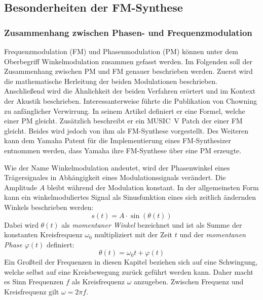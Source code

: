 \subsection{Besonderheiten der FM-Synthese}
\FloatBarrier
\subsubsection{Zusammenhang zwischen Phasen- und Frequenzmodulation}
Frequenzmodulation (FM) und Phasenmodulation (PM) können unter dem Oberbegriff Winkelmodulation zusammen gefasst werden. Im Folgenden soll der Zusammenhang zwischen PM und FM genauer beschrieben werden. Zuerst wird die mathematische Herleitung der beiden Modulationen beschrieben. Anschließend wird die Ähnlichkeit der beiden Verfahren erörtert und im Kontext der Akustik beschrieben.
Interessanterweise führte die Publikation von Chowning zu anfänglicher Verwirrung. In seinem Artikel definiert er eine Formel, welche einer PM gleicht. Zusätzlich beschreibt er ein MUSIC~V Patch der einer FM gleicht. Beides wird jedoch von ihm als FM-Synthese vorgestellt. \cite{rossum1999method} Des Weiteren kann dem Yamaha Patent für die Implementierung eines FM-Synthesizer entnommen werden, dass Yamaha ihre FM-Synthese über eine PM erzeugte. \cite{oya1987electronic} 

Wie der Name Winkelmodulation andeutet, wird der Phasenwinkel eines Trägersignales in Abhängigkeit eines Modulationssignals verändert. Die Amplitude \(A\) bleibt während der Modulation konstant. In der allgemeinsten Form kann ein winkelmoduliertes Signal als Sinusfunktion eines sich zeitlich ändernden Winkels beschrieben werden:
\begin{equation}
s(t)=A\cdot\sin(\theta(t))
\label{eq:signal_basis_funktion}
\end{equation}
Dabei wird \(\theta(t)\) als \textit{momentaner Winkel} bezeichnet und ist als Summe der konstanten Kreisfrequenz $\omega_0$ multipliziert mit der Zeit $t$ und der \textit{momentanen Phase} $\varphi(t)$ definiert:
\begin{equation*}
\theta(t)=\omega_0t + \varphi(t)
\end{equation*}
Ein Großteil der Frequenzen in diesen Kapitel beziehen sich auf eine Schwingung, welche selbst auf eine Kreisbewegung zurück geführt werden kann. Daher macht es Sinn Frequenzen $f$ als Kreisfrequenz $\omega$ anzugeben. Zwischen Frequenz und Kreisfrequenz gilt $\omega=2\pi f$.


